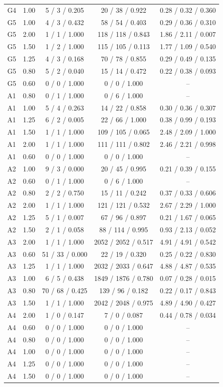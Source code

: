 \begin{tabular}{lcccc}
G4 & 1.00 & 5 / 3 / 0.205 & 20 / 38 / 0.922 & 0.28 / 0.32 / 0.360 \\
G5 & 1.00 & 4 / 3 / 0.432 & 58 / 54 / 0.403 & 0.29 / 0.36 / 0.310 \\
G5 & 2.00 & 1 / 1 / 1.000 & 118 / 118 / 0.843 & 1.86 / 2.11 / 0.007 \\
G5 & 1.50 & 1 / 2 / 1.000 & 115 / 105 / 0.113 & 1.77 / 1.09 / 0.540 \\
G5 & 1.25 & 4 / 3 / 0.168 & 70 / 78 / 0.855 & 0.29 / 0.49 / 0.135 \\
G5 & 0.80 & 5 / 2 / 0.040 & 15 / 14 / 0.472 & 0.22 / 0.38 / 0.093 \\
G5 & 0.60 & 0 / 0 / 1.000 & 0 / 0 / 1.000 & -- \\
A1 & 0.80 & 0 / 1 / 1.000 & 0 / 6 / 1.000 & -- \\
A1 & 1.00 & 5 / 4 / 0.263 & 14 / 22 / 0.858 & 0.30 / 0.36 / 0.307 \\
A1 & 1.25 & 6 / 2 / 0.005 & 22 / 66 / 1.000 & 0.38 / 0.99 / 0.193 \\
A1 & 1.50 & 1 / 1 / 1.000 & 109 / 105 / 0.065 & 2.48 / 2.09 / 1.000 \\
A1 & 2.00 & 1 / 1 / 1.000 & 111 / 111 / 0.802 & 2.46 / 2.21 / 0.998 \\
A1 & 0.60 & 0 / 0 / 1.000 & 0 / 0 / 1.000 & -- \\
A2 & 1.00 & 9 / 3 / 0.000 & 20 / 45 / 0.995 & 0.21 / 0.39 / 0.155 \\
A2 & 0.60 & 0 / 1 / 1.000 & 0 / 6 / 1.000 & -- \\
A2 & 0.80 & 2 / 2 / 0.750 & 15 / 11 / 0.242 & 0.37 / 0.33 / 0.606 \\
A2 & 2.00 & 1 / 1 / 1.000 & 121 / 121 / 0.532 & 2.67 / 2.29 / 1.000 \\
A2 & 1.25 & 5 / 1 / 0.007 & 67 / 96 / 0.897 & 0.21 / 1.67 / 0.065 \\
A2 & 1.50 & 2 / 1 / 0.058 & 88 / 114 / 0.995 & 0.93 / 2.13 / 0.052 \\
A3 & 2.00 & 1 / 1 / 1.000 & 2052 / 2052 / 0.517 & 4.91 / 4.91 / 0.542 \\
A3 & 0.60 & 51 / 33 / 0.000 & 22 / 19 / 0.320 & 0.25 / 0.22 / 0.830 \\
A3 & 1.25 & 1 / 1 / 1.000 & 2032 / 2033 / 0.647 & 4.88 / 4.87 / 0.535 \\
A3 & 1.00 & 6 / 5 / 0.438 & 1849 / 1876 / 0.780 & 0.07 / 0.28 / 0.015 \\
A3 & 0.80 & 70 / 68 / 0.425 & 139 / 96 / 0.182 & 0.22 / 0.17 / 0.843 \\
A3 & 1.50 & 1 / 1 / 1.000 & 2042 / 2048 / 0.975 & 4.89 / 4.90 / 0.427 \\
A4 & 2.00 & 1 / 0 / 0.147 & 7 / 0 / 0.087 & 0.44 / 0.78 / 0.034 \\
A4 & 0.60 & 0 / 0 / 1.000 & 0 / 0 / 1.000 & -- \\
A4 & 0.80 & 0 / 0 / 1.000 & 0 / 0 / 1.000 & -- \\
A4 & 1.00 & 0 / 0 / 1.000 & 0 / 0 / 1.000 & -- \\
A4 & 1.25 & 0 / 0 / 1.000 & 0 / 0 / 1.000 & -- \\
A4 & 1.50 & 0 / 0 / 1.000 & 0 / 0 / 1.000 & -- \\
\bottomrule
\end{tabular}
